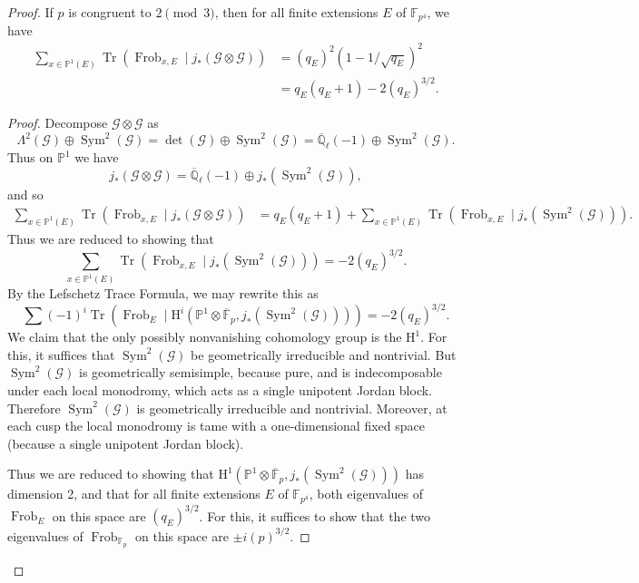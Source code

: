 \begin{proof}
If \(p\) is congruent to \(2\pmod 3\), then for all finite extensions \(E\) of \(\mathbb{F}_{p^4}\), we have
\[
\begin{aligned}
\sum_{x\in\mathbb{P}^1(E)}\operatorname{Tr}(\operatorname{Frob}_{x,E}\mid j_*(\mathcal{G}\otimes\mathcal{G}))
&=(q_E)^2(1-1/\sqrt{q_E})^2\\
&=q_E(q_E+1)-2(q_E)^{3/2}.
\end{aligned}
\]
\begin{proof}
Decompose \(\mathcal{G}\otimes\mathcal{G}\) as
\[
\Lambda^2(\mathcal{G})\oplus\operatorname{Sym}^2(\mathcal{G})
=\det(\mathcal{G})\oplus\operatorname{Sym}^2(\mathcal{G})
=\overline{\mathbb{Q}}_\ell(-1)\oplus\operatorname{Sym}^2(\mathcal{G}).
\]
Thus on \(\mathbb{P}^1\) we have
\[
j_*(\mathcal{G}\otimes\mathcal{G})=\overline{\mathbb{Q}}_\ell(-1)\oplus j_*(\operatorname{Sym}^2(\mathcal{G})),
\]
and so
\[
\begin{aligned}
\sum_{x\in\mathbb{P}^1(E)}\operatorname{Tr}(\operatorname{Frob}_{x,E}\mid j_*(\mathcal{G}\otimes\mathcal{G}))
&=q_E(q_E+1)+\sum_{x\in\mathbb{P}^1(E)}\operatorname{Tr}(\operatorname{Frob}_{x,E}\mid j_*(\operatorname{Sym}^2(\mathcal{G}))).
\end{aligned}
\]
Thus we are reduced to showing that
\[
\sum_{x\in\mathbb{P}^1(E)}\operatorname{Tr}(\operatorname{Frob}_{x,E}\mid j_*(\operatorname{Sym}^2(\mathcal{G})))=-2(q_E)^{3/2}.
\]
By the Lefschetz Trace Formula, we may rewrite this as
\[
\sum(-1)^i\operatorname{Tr}(\operatorname{Frob}_E\mid\mathrm{H}^i(\mathbb{P}^1\otimes\overline{\mathbb{F}}_p,j_*(\operatorname{Sym}^2(\mathcal{G}))))=-2(q_E)^{3/2}.
\]
We claim that the only possibly nonvanishing cohomology group is the \(\mathrm{H}^1\). For this, it suffices that \(\operatorname{Sym}^2(\mathcal{G})\) be geometrically irreducible and nontrivial. But \(\operatorname{Sym}^2(\mathcal{G})\) is geometrically semisimple, because pure, and is indecomposable under each local monodromy, which acts as a single unipotent Jordan block. Therefore \(\operatorname{Sym}^2(\mathcal{G})\) is geometrically irreducible and nontrivial. Moreover, at each cusp the local monodromy is tame with a one-dimensional fixed space (because a single unipotent Jordan block).

Thus we are reduced to showing that \(\mathrm{H}^1(\mathbb{P}^1\otimes\overline{\mathbb{F}}_p,j_*(\operatorname{Sym}^2(\mathcal{G})))\) has dimension 2, and that for all finite extensions \(E\) of \(\mathbb{F}_{p^4}\), both eigenvalues of \(\operatorname{Frob}_E\) on this space are \((q_E)^{3/2}\). For this, it suffices to show that the two eigenvalues of \(\operatorname{Frob}_{\mathbb{F}_p}\) on this space are \(\pm i(p)^{3/2}\).


\end{proof}
\end{proof}
